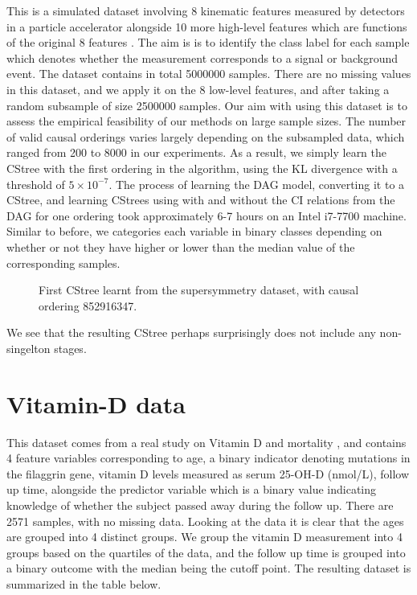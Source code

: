 \documentclass{tufte-book}
\begin{document}
This is a simulated dataset involving 8 kinematic features measured by detectors in a particle accelerator alongside 10 more high-level features which are functions of the original 8 features \cite{baldi-2014-searc-exotic}. The aim is is to identify the class label for each sample which denotes whether the measurement corresponds to a signal or background event. The dataset contains in total 5000000 samples. There are no missing values in this dataset, and we apply it on the 8 low-level features, and after taking a random subsample of size 2500000 samples. Our aim with using this dataset is to assess the empirical feasibility of our methods on large sample sizes. The number of valid causal orderings varies largely depending on the subsampled data, which ranged from 200 to 8000 in our experiments. As a result, we simply learn the CStree with the first ordering in the algorithm,  using the KL divergence with a threshold of \(5\times 10^{-7}\). The process of learning the DAG model, converting it to a CStree, and learning CStrees using with and without the CI relations from the DAG for one ordering took approximately 6-7 hours on an Intel i7-7700 machine. Similar to before, we categories each variable in binary classes depending on whether or not they have higher or lower than the median value of the corresponding samples. 

\begin{figure}[!h]\label{fig:susy1}
   \begin{floatrow}
%
\caption{First CStree learnt from the supersymmetry dataset, with causal ordering 852916347.}
        
   \end{floatrow}
\end{figure}

We see that the resulting CStree perhaps surprisingly does not include any non-singelton stages.


\section{Vitamin-D data}
\label{sec:orgda4e96e}
This dataset comes from a real study on Vitamin D and mortality \cite{martinussen-2017-instr-variab}, and contains 4 feature variables corresponding to age, a binary indicator denoting mutations in the filaggrin gene, vitamin D levels measured  as serum 25-OH-D (nmol/L), follow up time, alongside the predictor variable which is a binary value indicating knowledge of whether the subject passed away during the follow up. There are 2571 samples, with no missing data. Looking at the data it is clear that the ages are grouped into 4 distinct groups. We group the vitamin D measurement into 4 groups based on the quartiles of the data, and the follow up time is grouped into a binary outcome with the median being the cutoff point. The resulting dataset is summarized in the table below.
\end{document}
